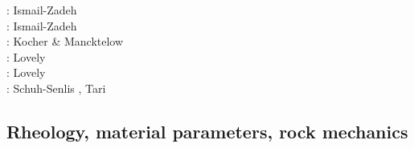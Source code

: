 \begin{scriptsize}
\twothousandone: Ismail-Zadeh \etal \cite{istv01}\\
\twothousandfour: Ismail-Zadeh \etal \cite{istt04}\\
\twothousandfive: Kocher \& Mancktelow \cite{koma05}\\
\twothousandtwelve: Lovely \etal \cite{lofg12}\\
\twothousandeighteen: Lovely \etal \cite{lojm18}\\
\twothousandtwenty: Schuh-Senlis \etal \cite{sctc20}, Tari \etal \cite{taas20}
\end{scriptsize}

\subsection{Rheology, material parameters, rock mechanics}

